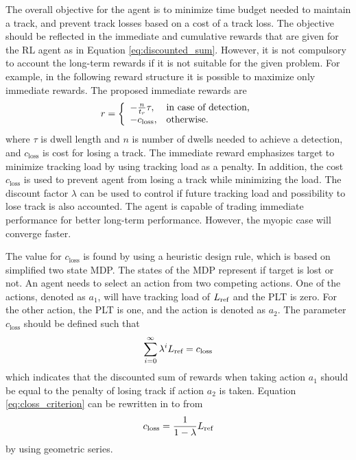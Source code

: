 \documentclass[english, 12pt, a4paper, elec, utf8, a-1b, online]{aaltothesis}
\newcommand{\closs}{c_\text{loss}}
\begin{document}
The overall objective for the agent is to minimize time budget needed to maintain a track, and prevent track losses based on a cost of a track loss.
The objective should be reflected in the immediate and cumulative rewards that are given for the RL agent as in Equation \ref{eq:discounted_sum}. 
However, it is not compulsory to account the long-term rewards if it is not suitable for the given problem.
For example, in the following reward structure it is possible to maximize only immediate rewards.
The proposed immediate rewards are
\begin{equation}
    r = \left\{
    \begin{array}{ll}
        -\frac{n}{\ri} \tau, & \text{in case of detection,}\\
        -\closs, & \text{otherwise}.
    \end{array} \right.
\end{equation}
where $\tau$ is dwell length and $n$ is number of dwells needed to achieve a detection, and $\closs$ is cost for losing a track.
The immediate reward emphasizes target to minimize tracking load by using tracking load as a penalty.
In addition, the cost $\closs$ is used to prevent agent from losing a track while minimizing the load.
The discount factor $\lambda$ can be used to control if future tracking load and possibility to lose track is also accounted.
The agent is capable of trading immediate performance for better long-term performance.
However, the myopic case will converge faster.

The value for $\closs$ is found by using a heuristic design rule, which is based on simplified two state MDP.
The states of the MDP represent if target is lost or not.
An agent needs to select an action from two competing actions.
One of the actions, denoted as $a_1$, will have tracking load of $L_\text{ref}$ and the PLT is zero.
For the other action, the PLT is one, and the action is denoted as $a_2$.
The parameter $\closs$ should be defined such that
\begin{equation}\label{eq:closs_criterion}
    \sum_{i=0}^\infty \lambda^i \lref = \closs
\end{equation}
which indicates that the discounted sum of rewards when taking action $a_1$ should be equal to the penalty of losing track if action $a_2$ is taken.
Equation \eqref{eq:closs_criterion} can be rewritten in to from
\begin{equation}
    \closs = \frac{1}{1-\lambda} \lref
\end{equation}
 by using geometric series.
\end{document}
